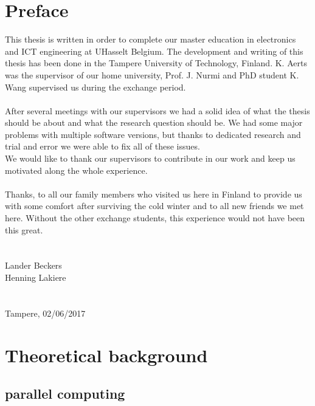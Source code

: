 \documentclass[a4paper, 11pt]{report}
\begin{document}
\chapter*{Preface}

This thesis is written in order to complete our master education in electronics and ICT engineering at UHasselt Belgium. The development and writing of this thesis has been done in the Tampere University of Technology, Finland. K. Aerts was the supervisor of our home university, Prof. J. Nurmi and PhD student K. Wang supervised us during the exchange period. \\\\
After several meetings with our supervisors we had a solid idea of what the thesis should be about and what the research question should be. We had some major problems with multiple software versions,  but thanks to dedicated research and trial and error we were able to fix all of these issues.\\
We would like to thank our supervisors to contribute in our work and keep us motivated along the whole experience.\\\\
Thanks, to all our family members who visited us here in Finland to provide us with some comfort after surviving the cold winter and to all new friends we met here. Without the other exchange students, this experience would not have been this great.\\\\\\
Lander Beckers\\
Henning Lakiere\\\\\\
Tampere, 02/06/2017


\chapter{Theoretical background}

\section{parallel computing}
\end{document}
